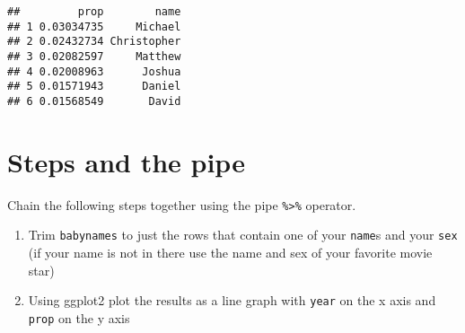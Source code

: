 \documentclass[
]{article}
\newenvironment{Shaded}{\begin{snugshade}}{\end{snugshade}}
\newcommand{\DecValTok}[1]{\textcolor[rgb]{0.00,0.00,0.81}{#1}}
\newcommand{\KeywordTok}[1]{\textcolor[rgb]{0.13,0.29,0.53}{\textbf{#1}}}
\newcommand{\NormalTok}[1]{#1}
\newcommand{\OperatorTok}[1]{\textcolor[rgb]{0.81,0.36,0.00}{\textbf{#1}}}
\newcommand{\StringTok}[1]{\textcolor[rgb]{0.31,0.60,0.02}{#1}}
\providecommand{\tightlist}{%
  \setlength{\itemsep}{0pt}\setlength{\parskip}{0pt}}
\begin{document}
\begin{Shaded}
\end{Shaded}

\begin{verbatim}
##         prop        name
## 1 0.03034735     Michael
## 2 0.02432734 Christopher
## 3 0.02082597     Matthew
## 4 0.02008963      Joshua
## 5 0.01571943      Daniel
## 6 0.01568549       David
\end{verbatim}

\hypertarget{steps-and-the-pipe-1}{%
\section{Steps and the pipe}\label{steps-and-the-pipe-1}}

Chain the following steps together using the pipe
\texttt{\%\textgreater{}\%} operator.

\begin{enumerate}
\def\labelenumi{\arabic{enumi}.}
\tightlist
\item
  Trim \texttt{babynames} to just the rows that contain one of your
  \texttt{name}s and your \texttt{sex} (if your name is not in there use
  the name and sex of your favorite movie star)
\item
  Using ggplot2 plot the results as a line graph with \texttt{year} on
  the x axis and \texttt{prop} on the y axis
\end{enumerate}

\begin{Shaded}
\end{Shaded}
\end{document}

